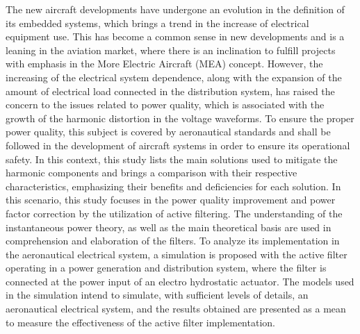 The new aircraft developments have undergone an evolution in the definition of its embedded systems, which brings a trend in the increase of electrical equipment use. This has become a common sense in new developments and is a leaning in the aviation market, where there is an inclination to fulfill projects with emphasis in the More Electric Aircraft (MEA) concept. However, the increasing of the electrical system dependence, along with the expansion of the amount of electrical load connected in the distribution system, has raised the concern to the issues related to power quality, which is associated with the growth of the harmonic distortion in the voltage waveforms. To ensure the proper power quality, this subject is covered by aeronautical standards and shall be followed in the development of aircraft systems in order to ensure its operational safety. In this context, this study lists the main solutions used to mitigate the harmonic components and brings a comparison with their respective characteristics, emphasizing their benefits and deficiencies for each solution. In this scenario, this study focuses in the power quality improvement and power factor correction by the utilization of active filtering. The understanding of the instantaneous power theory, as well as the main theoretical basis are used in comprehension and elaboration of the filters. To analyze its implementation in the aeronautical electrical system, a simulation is proposed with the active filter operating in a power generation and distribution system, where the filter is connected at the power input of an electro hydrostatic actuator. The models used in the simulation intend to simulate, with sufficient levels of details, an aeronautical electrical system, and the results obtained are presented as a mean to measure the effectiveness of the active filter implementation.